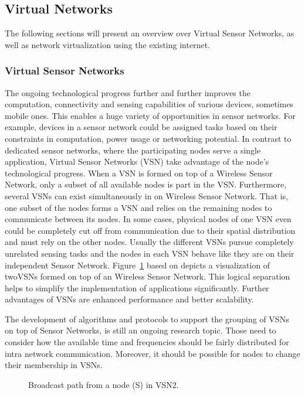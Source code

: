\documentclass[12pt,journal]{IEEEtran}
\begin{document}
\subsection{Virtual Networks}
The following sections will present an overview over Virtual Sensor Networks, as well as network virtualization using the existing internet.
\subsubsection{Virtual Sensor Networks}
The ongoing technological progress further and further improves the computation, connectivity and sensing capabilities of various devices, sometimes mobile ones. \cite{Jayasumana} This enables a huge variety of opportunities in sensor networks. For example, devices in a sensor network could be assigned tasks based on their constraints in computation, power usage or networking potential. In contrast to dedicated sensor networks, where the participating nodes serve a single application, Virtual Sensor Networks (VSN) take advantage of the node’s technological progress. When a VSN is formed on top of a Wireless Sensor Network, only a subset of all available nodes is part in the VSN. Furthermore, several VSNs can exist simultaneously in on Wireless Sensor Network. \cite{Jayasumana} That is, one subset of the nodes forms a VSN and relies on the remaining nodes to communicate between its nodes. In some cases, physical nodes of one VSN even could be completely cut off from communication due to their spatial distribution and must rely on the other nodes. Usually the different VSNs pursue completely unrelated sensing tasks and the nodes in each VSN behave like they are on their independent Sensor Network. Figure~\ref{vsnfig} based on \cite{Jayasumana} depicts a visualization of twoVSNs formed on top of an Wireless Sensor Network. This logical separation helps to simplify the implementation of applications significantly. \cite{Jayasumana} Further advantages of VSNs are enhanced performance and better scalability.

The development of algorithms and protocols to support the grouping of VSNs on top of Sensor Networks, is still an ongoing research topic. Those need to consider how the available time and frequencies should be fairly distributed for intra network communication. Moreover, it should be possible for nodes to change their membership in VSNs.

\begin{figure}
 \centering
 \caption{Broadcast path from a node (S) in VSN2.}
 \label{vsnfig}
\end{figure}
\end{document}
